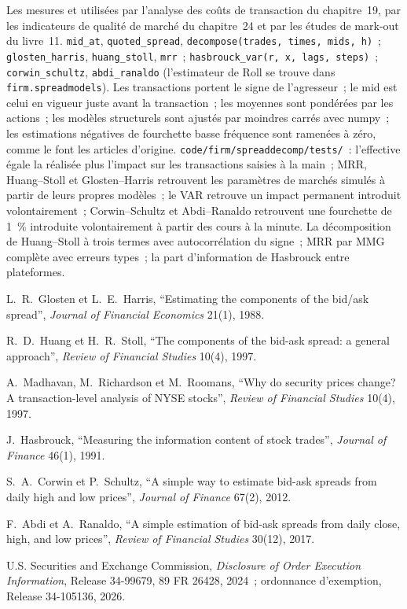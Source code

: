 \begin{build}
 Les mesures et  utilisées par l'analyse des coûts de transaction du chapitre~19, par les indicateurs de qualité de marché du chapitre~24
et par les études de mark-out du livre~11.
 \texttt{mid\_at}, \texttt{quoted\_spread}, \texttt{decompose(trades, times, mids, h)}~; \texttt{glosten\_harris}, \texttt{huang\_stoll},
\texttt{mrr}~; \texttt{hasbrouck\_var(r, x, lags, steps)}~; \texttt{corwin\_schultz}, \texttt{abdi\_ranaldo} (l'estimateur de Roll se trouve dans
\texttt{firm.spreadmodels}).
 Les transactions portent le signe de l'agresseur~; le mid est celui en vigueur juste avant la transaction~; les moyennes sont pondérées par les actions~; les modèles structurels
sont ajustés par moindres carrés avec numpy~; les estimations négatives de fourchette basse fréquence sont ramenées à zéro, comme le font les articles d'origine.
 \texttt{code/firm/spreaddecomp/tests/}~: l'effective égale la réalisée plus l'impact sur les transactions saisies à la main~; MRR, Huang--Stoll et
Glosten--Harris retrouvent les paramètres de marchés simulés à partir de leurs propres modèles~; le VAR retrouve un impact permanent introduit volontairement~; Corwin--Schultz et
Abdi--Ranaldo retrouvent une fourchette de 1~\% introduite volontairement à partir des cours à la minute.
 La décomposition de Huang--Stoll à trois termes avec autocorrélation du signe~; MRR par MMG complète avec erreurs types~; la part d'information de Hasbrouck
entre plateformes.
\end{build}

\begin{omsources}
\item L.~R.~Glosten et L.~E.~Harris, ``Estimating the components of the bid/ask spread'', \emph{Journal of Financial Economics} 21(1), 1988.
\item R.~D.~Huang et H.~R.~Stoll, ``The components of the bid-ask spread: a general approach'', \emph{Review of Financial Studies} 10(4), 1997.
\item A.~Madhavan, M.~Richardson et M.~Roomans, ``Why do security prices change? A transaction-level analysis of NYSE stocks'', \emph{Review of Financial
Studies} 10(4), 1997.
\item J.~Hasbrouck, ``Measuring the information content of stock trades'', \emph{Journal of Finance} 46(1), 1991.
\item S.~A.~Corwin et P.~Schultz, ``A simple way to estimate bid-ask spreads from daily high and low prices'', \emph{Journal of Finance} 67(2), 2012.
\item F.~Abdi et A.~Ranaldo, ``A simple estimation of bid-ask spreads from daily close, high, and low prices'', \emph{Review of Financial Studies} 30(12), 2017.
\item U.S. Securities and Exchange Commission, \emph{Disclosure of Order Execution Information}, Release 34-99679, 89 FR 26428, 2024~; ordonnance d'exemption,
Release 34-105136, 2026.
\end{omsources}

